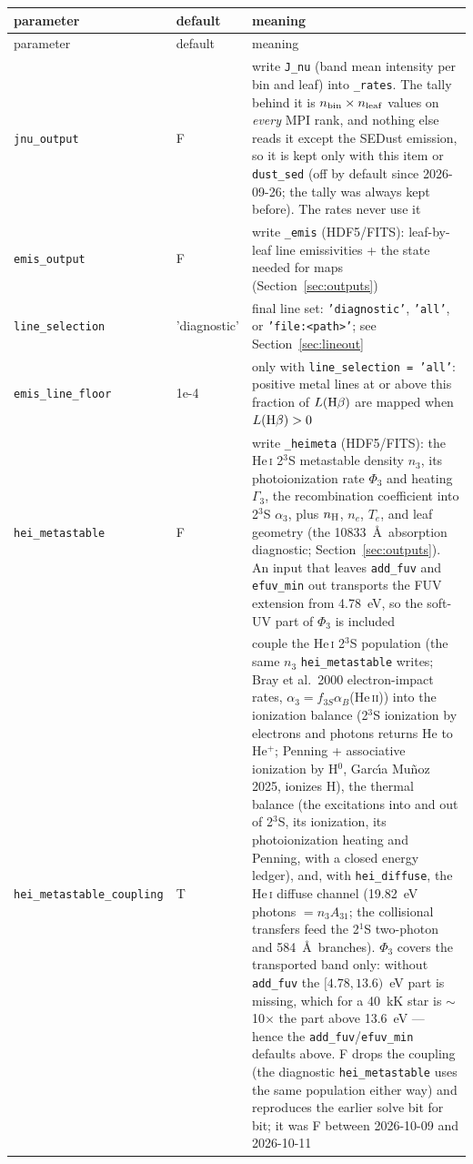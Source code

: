 \documentclass[english,a4paper]{my_memo}
\newcommand{\code}[1]{\texttt{#1}}
\begin{document}
{\small
\begin{longtable}{llp{7.2cm}}
\toprule
parameter & default & meaning \\
\midrule
\endfirsthead
\toprule
parameter & default & meaning \\
\midrule
\endhead
\bottomrule
\endlastfoot
\code{jnu\_output} & F & write \code{J\_nu} (band mean intensity per bin and leaf) into \code{\_rates}.  The tally behind it is $n_{\rm bin}\times n_{\rm leaf}$ values on \emph{every} MPI rank, and nothing else reads it except the SEDust emission, so it is kept only with this item or \code{dust\_sed} (off by default since 2026-09-26; the tally was always kept before).  The rates never use it \\
\code{emis\_output} & F & write \code{\_emis} (HDF5/FITS): leaf-by-leaf line emissivities + the state needed for maps (Section~\ref{sec:outputs}) \\
\code{line\_selection} & 'diagnostic' & final line set: \code{'diagnostic'}, \code{'all'}, or \code{'file:<path>'}; see Section~\ref{sec:lineout} \\
\code{emis\_line\_floor} & 1e-4 & only with \code{line\_selection = 'all'}: positive metal lines at or above this fraction of $L({\rm H}\beta)$ are mapped when $L({\rm H}\beta)>0$ \\
\code{hei\_metastable} & F & write \code{\_heimeta} (HDF5/FITS): the He\,\textsc{i} 2$^3$S metastable density $n_3$, its photoionization rate $\Phi_3$ and heating $\Gamma_3$, the recombination coefficient into 2$^3$S $\alpha_3$, plus $n_{\rm H}$, $n_e$, $T_e$, and leaf geometry (the 10833~\AA\ absorption diagnostic; Section~\ref{sec:outputs}).  An input that leaves \code{add\_fuv} and \code{efuv\_min} out transports the FUV extension from 4.78~eV, so the soft-UV part of $\Phi_3$ is included \\
\code{hei\_metastable\_coupling} & T & couple the He\,\textsc{i} 2$^3$S population (the same $n_3$ \code{hei\_metastable} writes; Bray et al.\ 2000 electron-impact rates, $\alpha_3 = f_{3S}\alpha_B$(He\,\textsc{ii})) into the ionization balance (2$^3$S ionization by electrons and photons returns He to He$^+$; Penning + associative ionization by H$^0$, Garc\'{\i}a Mu\~noz 2025, ionizes H), the thermal balance (the excitations into and out of 2$^3$S, its ionization, its photoionization heating and Penning, with a closed energy ledger), and, with \code{hei\_diffuse}, the He\,\textsc{i} diffuse channel (19.82~eV photons $= n_3A_{31}$; the collisional transfers feed the 2$^1$S two-photon and 584~\AA\ branches).  $\Phi_3$ covers the transported band only: without \code{add\_fuv} the $[4.78, 13.6)$~eV part is missing, which for a 40~kK star is $\sim$10$\times$ the part above 13.6~eV --- hence the \code{add\_fuv}/\code{efuv\_min} defaults above.  F drops the coupling (the diagnostic \code{hei\_metastable} uses the same population either way) and reproduces the earlier solve bit for bit; it was F between 2026-10-09 and 2026-10-11 \\

\end{longtable}}
\end{document}
